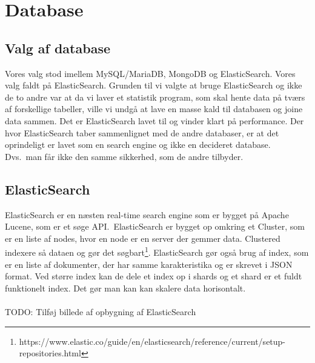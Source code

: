 \section{Database}
\subsection{Valg af database}
Vores valg stod imellem MySQL/MariaDB, MongoDB og ElasticSearch. Vores valg faldt på ElasticSearch. Grunden til vi valgte at bruge ElasticSearch og ikke de to andre var at da vi laver et statistik program, som skal hente data på tværs af forskellige tabeller, ville vi undgå at lave en masse kald til databasen og joine data sammen. Det er ElasticSearch lavet til og vinder klart på performance. 
Der hvor ElasticSearch taber sammenlignet med de andre databaser, er at det oprindeligt er lavet som en search engine og ikke en decideret database. Dvs.\ man får ikke den samme sikkerhed, som de andre tilbyder. 
\subsection{ElasticSearch}
ElasticSearch er en næsten real-time search engine som er bygget på Apache Lucene, som er et søge API.\
ElasticSearch er bygget op omkring et Cluster, som er en liste af nodes, hvor en node er en server der gemmer data. Clustered indexere så dataen og gør det søgbart\footnote{https://www.elastic.co/guide/en/elasticsearch/reference/current/setup-repositories.html}.
ElasticSearch gør også brug af index, som er en liste af dokumenter, der har samme karakteristika og er skrevet i JSON format. Ved større index kan de dele et index op i shards og et shard er et fuldt funktionelt index. Det gør man kan kan skalere data horisontalt.
\\\\
TODO: Tilføj billede af opbygning af ElasticSearch

